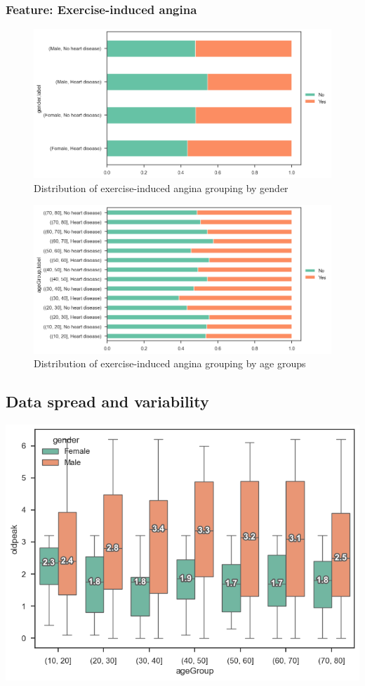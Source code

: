 \subsubsection{Feature: Exercise-induced angina}

\begin{figure}
    \caption{Distribution of exercise-induced angina grouping by gender}\label{frequency-exerciseangina-gender-percent}
    \centering
    \includegraphics[width=\linewidth]{media/frequency-11-gender-exerciseangina.png}
\end{figure}

\begin{figure}
    \caption{Distribution of exercise-induced angina grouping by age groups}\label{frequency-exerciseangina-agegroup-percent}
    \centering
    \includegraphics[width=\linewidth]{media/frequency-12-agegroup-exerciseangina.png}
\end{figure}

\subsection{Data spread and variability}

\includegraphics[width=0.8\linewidth]{media/boxplot-01-agegroup-gender-oldpeak.png}


